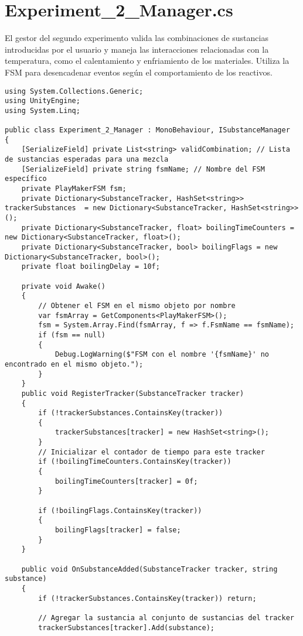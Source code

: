 \section{Experiment\_2\_Manager.cs}\label{script:Experiment2Manager}
El gestor del segundo experimento valida las combinaciones de sustancias introducidas por el usuario y maneja las interacciones relacionadas con la temperatura, como el calentamiento y enfriamiento de los materiales. Utiliza la FSM para desencadenar eventos según el comportamiento de los reactivos.
\begin{verbatim}
using System.Collections.Generic;
using UnityEngine;
using System.Linq;

public class Experiment_2_Manager : MonoBehaviour, ISubstanceManager
{
    [SerializeField] private List<string> validCombination; // Lista de sustancias esperadas para una mezcla
    [SerializeField] private string fsmName; // Nombre del FSM específico
    private PlayMakerFSM fsm;
    private Dictionary<SubstanceTracker, HashSet<string>> trackerSubstances  = new Dictionary<SubstanceTracker, HashSet<string>>();
    private Dictionary<SubstanceTracker, float> boilingTimeCounters = new Dictionary<SubstanceTracker, float>();
    private Dictionary<SubstanceTracker, bool> boilingFlags = new Dictionary<SubstanceTracker, bool>();
    private float boilingDelay = 10f;

    private void Awake() 
    {
        // Obtener el FSM en el mismo objeto por nombre
        var fsmArray = GetComponents<PlayMakerFSM>();
        fsm = System.Array.Find(fsmArray, f => f.FsmName == fsmName);
        if (fsm == null)
        {
            Debug.LogWarning($"FSM con el nombre '{fsmName}' no encontrado en el mismo objeto.");
        }
    }
    public void RegisterTracker(SubstanceTracker tracker)
    {
        if (!trackerSubstances.ContainsKey(tracker))
        {
            trackerSubstances[tracker] = new HashSet<string>();
        }
        // Inicializar el contador de tiempo para este tracker
        if (!boilingTimeCounters.ContainsKey(tracker))
        {
            boilingTimeCounters[tracker] = 0f;
        }

        if (!boilingFlags.ContainsKey(tracker))
        {
            boilingFlags[tracker] = false;
        }
    }

    public void OnSubstanceAdded(SubstanceTracker tracker, string substance)
    {
        if (!trackerSubstances.ContainsKey(tracker)) return;

        // Agregar la sustancia al conjunto de sustancias del tracker
        trackerSubstances[tracker].Add(substance);


\end{verbatim}
